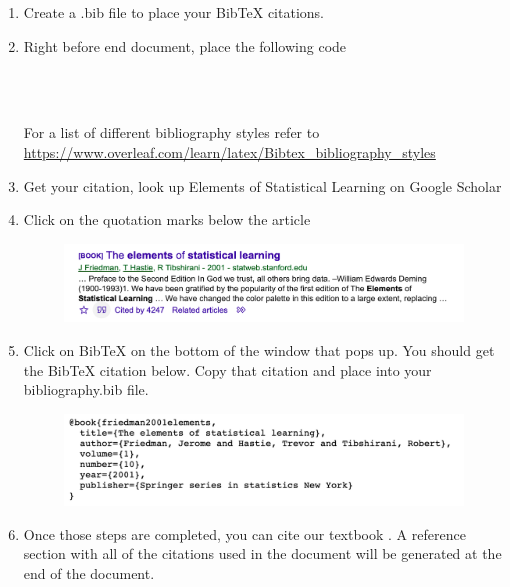 \documentclass{article}
\begin{document}
\begin{enumerate}
    \item Create a .bib file to place your BibTeX citations.
    \item Right before end document, place the following code
    \begin{verbatim}
        
        
    \end{verbatim}
    For a list of different bibliography styles refer to \url{https://www.overleaf.com/learn/latex/Bibtex_bibliography_styles}
    \item Get your citation, look up Elements of Statistical Learning on Google Scholar
    \item Click on the quotation marks below the article
    \begin{figure}[h]
        \centering
        \includegraphics[scale=0.5]{../img/esl.png}
    \end{figure}
    \item Click on BibTeX on the bottom of the window that pops up. You should get the BibTeX citation below. Copy that citation and place into your bibliography.bib file.
    \begin{figure}[h]
        \centering
        \includegraphics[scale=0.5]{../img/eslcite.png}
    \end{figure}
    \item Once those steps are completed, you can cite our textbook \cite{friedman2001elements}. A reference section with all of the citations used in the document will be generated at the end of the document.
\end{enumerate}




\end{document}
